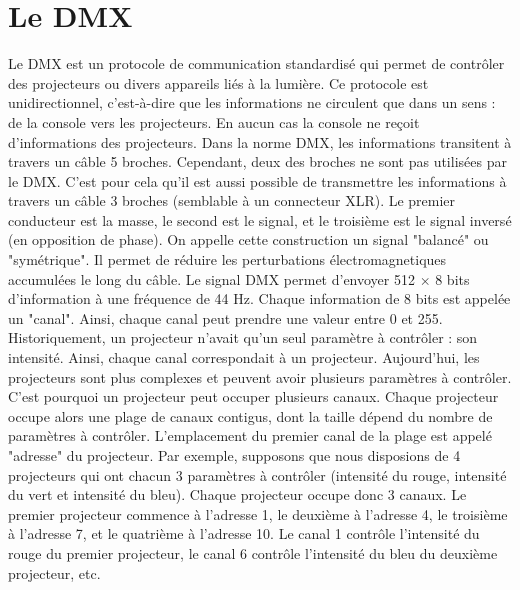 \section{Le DMX}
\label{sec:dmx}

Le DMX est un protocole de communication standardisé qui permet de contrôler des projecteurs ou divers appareils liés à la lumière.
\newline
Ce protocole est unidirectionnel, c'est-à-dire que les informations ne circulent que dans un sens : de la console vers les projecteurs. En aucun cas la console ne reçoit d'informations des projecteurs.
\newline
\newline
Dans la norme DMX, les informations transitent à travers un câble 5 broches. Cependant, deux des broches ne sont pas utilisées par le DMX. C'est pour cela qu'il est aussi possible de transmettre les informations à travers un câble 3 broches (semblable à un connecteur XLR).
\newline
Le premier conducteur est la masse, le second est le signal, et le troisième est le signal inversé (en opposition de phase). On appelle cette construction un signal "balancé" ou "symétrique". Il permet de réduire les perturbations électromagnetiques accumulées le long du câble.
\newline
\newline
Le signal DMX permet d'envoyer 512 $\times$ 8 bits d'information à une fréquence de 44 Hz.
Chaque information de 8 bits est appelée un "canal". Ainsi, chaque canal peut prendre une valeur entre 0 et 255.
\newline
Historiquement, un projecteur n'avait qu'un seul paramètre à contrôler : son intensité. Ainsi, chaque canal correspondait à un projecteur.
Aujourd'hui, les projecteurs sont plus complexes et peuvent avoir plusieurs paramètres à contrôler. C'est pourquoi un projecteur peut occuper plusieurs canaux.
Chaque projecteur occupe alors une plage de canaux contigus, dont la taille dépend du nombre de paramètres à contrôler. L'emplacement du premier canal de la plage est appelé "adresse" du projecteur.
\newline
Par exemple, supposons que nous disposions de 4 projecteurs qui ont chacun 3 paramètres à contrôler (intensité du rouge, intensité du vert et intensité du bleu). Chaque projecteur occupe donc 3 canaux. Le premier projecteur commence à l'adresse 1, le deuxième à l'adresse 4, le troisième à l'adresse 7, et le quatrième à l'adresse 10.
Le canal 1 contrôle l'intensité du rouge du premier projecteur, le canal 6 contrôle l'intensité du bleu du deuxième projecteur, etc.
